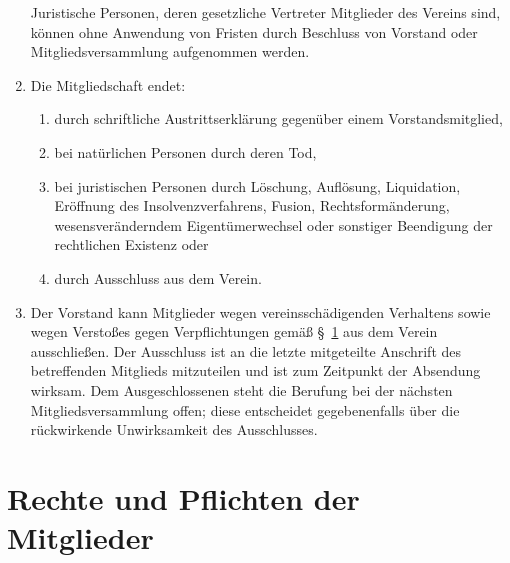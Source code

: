\documentclass[a4paper, 10pt, headings=normal]{scrartcl}
\begin{document}
\begin{multicols}{2}
\begin{enumerate}[label={(\arabic*)}]
		Juristische Personen, deren gesetzliche Vertreter Mitglieder des Vereins sind, können ohne Anwendung von Fristen durch Beschluss von Vorstand oder Mitgliedsversammlung aufgenommen werden.
	\item
		Die Mitgliedschaft endet:
		\begin{enumerate}[label={\arabic*.}]
			\item
				durch schriftliche Austrittserklärung gegenüber einem Vorstandsmitglied,
			\item
				bei natürlichen Personen durch deren Tod,
			\item
				bei juristischen Personen durch Löschung, Auflösung, Liquidation, Eröffnung des Insolvenzverfahrens, Fusion, Rechtsformänderung, wesensveränderndem Eigentümerwechsel oder sonstiger Beendigung der rechtlichen Existenz oder
			\item
				durch Ausschluss aus dem Verein.
		\end{enumerate}
	\item
		Der Vorstand kann Mitglieder wegen vereinsschädigenden Verhaltens sowie wegen Verstoßes gegen Verpflichtungen gemäß §~\ref{par:rechte-pflichten-mitglieder} aus dem Verein ausschließen.
		Der Ausschluss ist an die letzte mitgeteilte Anschrift des betreffenden Mitglieds mitzuteilen und ist zum Zeitpunkt der Absendung wirksam.
		Dem Ausgeschlossenen steht die Berufung bei der nächsten Mitgliedsversammlung offen; diese entscheidet gegebenenfalls über die rückwirkende Unwirksamkeit des Ausschlusses.
\end{enumerate}

\section{Rechte und Pflichten der Mitglieder}
\label{par:rechte-pflichten-mitglieder}


\end{multicols}
\end{document}
